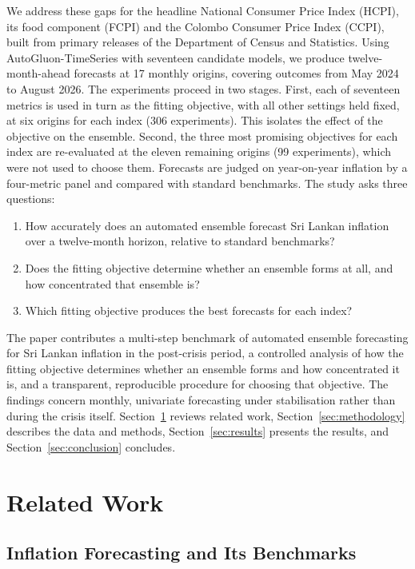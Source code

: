 \documentclass[12pt]{article}
\begin{document}
We address these gaps for the headline National Consumer Price Index (HCPI),
its food component (FCPI) and the Colombo Consumer Price Index (CCPI), built
from primary releases of the Department of Census and Statistics. Using
AutoGluon-TimeSeries with seventeen candidate models, we produce
twelve-month-ahead forecasts at 17 monthly origins, covering outcomes from May
2024 to August 2026. The experiments proceed in two stages. First, each of
seventeen metrics is used in turn as the fitting objective, with all other
settings held fixed, at six origins for each index (306 experiments). This
isolates the effect of the objective on the ensemble. Second, the three most
promising objectives for each index are re-evaluated at the eleven remaining
origins (99 experiments), which were not used to choose them. Forecasts are
judged on year-on-year inflation by a four-metric panel and compared with
standard benchmarks. The study asks three questions:
\begin{enumerate}
    \item How accurately does an automated ensemble forecast Sri Lankan
          inflation over a twelve-month horizon, relative to standard
          benchmarks?
    \item Does the fitting objective determine whether an ensemble forms at
          all, and how concentrated that ensemble is?
    \item Which fitting objective produces the best forecasts for each index?
\end{enumerate}

The paper contributes a multi-step benchmark of automated ensemble forecasting
for Sri Lankan inflation in the post-crisis period, a controlled analysis of
how the fitting objective determines whether an ensemble forms and how
concentrated it is, and a transparent,
reproducible procedure for choosing that objective. The findings concern
monthly, univariate forecasting under stabilisation rather than during the
crisis itself. Section~\ref{sec:literature} reviews related work,
Section~\ref{sec:methodology} describes the data and methods,
Section~\ref{sec:results} presents the results, and
Section~\ref{sec:conclusion} concludes.
\section{Related Work}
\label{sec:literature}

\subsection{Inflation Forecasting and Its Benchmarks}
\label{sec:lit-inflation}
\end{document}
